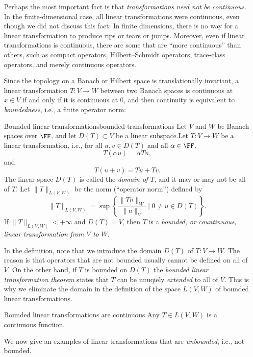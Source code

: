 Perhaps the most important fact is that \emph{transformations need not be continuous}. In the finite-dimensional case, all linear transformations were continuous, even though we did not discuss this fact: In finite dimensions, there is no way for a linear transformation to produce rips or tears or jumps. Moreover, even if linear transformations is continuous, there are some  that are ``more continuous'' than others, such as compact operators, Hilbert--Schmidt operators, trace-class operators, and merely continuous operators.

Since the topology on a Banach or Hilbert space is translationally invariant, a linear transformation $T: V \to W$ between two Banach spaces is continuous at $x \in V$ if and only if it is continuous at $0$, and then continuity is equivalent to \emph{boundedness}, i.e., a finite operator norm:
\begin{myDefinition}{Bounded linear transformations}{bounded transformations}
    Let $V$ and $W$ be Banach spaces over $\FF$, and let $D(T) \subset V$ be a linear subspace.Let $T : V \to W$ be a linear transformation, i.e., for all $u,v \in D(T)$ and all $\alpha \in \FF$,
    $$ T(\alpha u) = \alpha Tu, $$
    and
    $$ T(u + v) = Tu + Tv. $$
    The linear space $D(T)$ is called the \emph{domain of $T$}, and it may or may not be all of $T$.
    Let $\|T\|_{L(V,W)}$ be the norm (``operator norm'') defined by
    \begin{equation}
        \|T\|_{L(V,W)} = \sup \left\{ \frac{\|T u\|_W}{\|u\|_V} \mid 0 \neq u \in D(T) \right\}.
    \end{equation}
    If $\|T\|_{L(V,W)}< +\infty$ and $D(T) = V$, then $T$ is a \emph{bounded, or countinuous, linear transformation from $V$ to $W$}.
\end{myDefinition}
In the definition, note that we introduce the domain $D(T)$ of $T : V \to W$. The reason is that operators that are not bounded usually cannot be defined on all of $V$. On the other hand, if $T$ is bounded on $D(T)$ the \emph{bounded linear transformation theorem} states that $T$ can be unuqiely \emph{extended} to all of $V$. This is why we eliminate the domain in the definition of the space $L(V,W)$ of bounded linear transformations.

\begin{myTheorem}{Bounded linear transformations are continuous}{}
    Any $T \in L(V,W)$ is a continuous function.    
\end{myTheorem}


We now give an examples of linear transformations that are \emph{unbounded}, i.e., not bounded.

